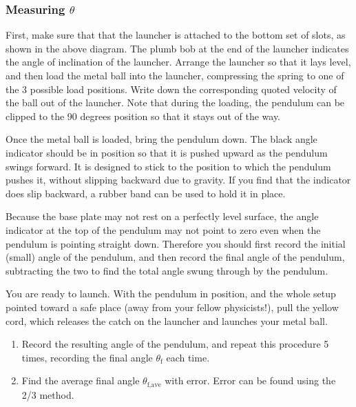 \subsubsection{Measuring $\theta$}

First, make sure that that the launcher is attached to the bottom set of slots, as shown in the above diagram. The plumb bob at the end of the launcher indicates the angle of inclination of the launcher.  Arrange the launcher so that it lays level, and then load the metal ball into the launcher, compressing the spring to one of the 3 possible load positions. Write down the corresponding quoted velocity of the ball out of the launcher.  Note that during the loading, the pendulum can be clipped to the 90 degrees position so that it stays out of the way. \myskip

Once the metal ball is loaded, bring the pendulum down.  The black angle indicator should be in position so that it is pushed upward as the pendulum swings forward.  It is designed to stick to the position to which the pendulum pushes it, without slipping backward due to gravity.  If you find that the indicator does slip backward, a rubber band can be used to hold it in place. \myskip

Because the base plate may not rest on a perfectly level surface, the angle indicator at the top of the pendulum may not point to zero even when the pendulum is pointing straight down.  Therefore you should first record the initial (small) angle of the pendulum, and then record the final angle of the pendulum, subtracting the two to find the total angle swung through by the pendulum.\myskip

You are ready to launch.  With the pendulum in position, and the whole setup pointed toward a safe place (away from your fellow physicists!), pull the yellow cord, which releases the catch on the launcher and launches your metal ball. 
\begin{enumerate}  
\item Record the resulting angle of the pendulum, and repeat this procedure 5 times, recording the final angle $\theta_\text{f}$ each time.
\item Find the average final angle $\theta_\text{f,ave}$ with error. Error can be found using the 2/3 method.
\end{enumerate}

